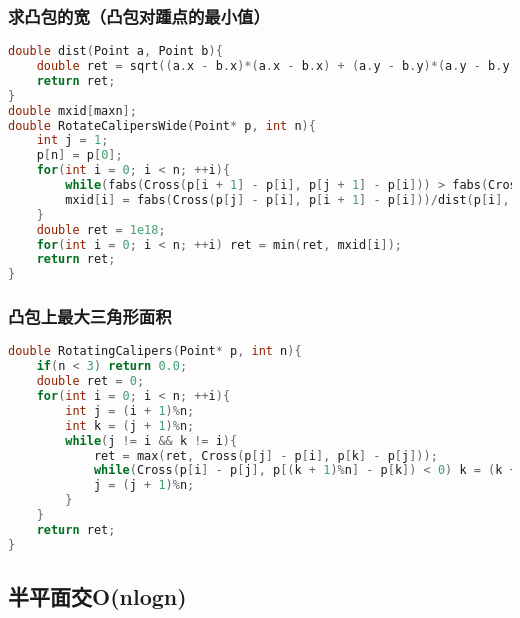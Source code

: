 \subsubsection{求凸包的宽（凸包对踵点的最小值）}

\begin{lstlisting}[language=C++]   
double dist(Point a, Point b){
    double ret = sqrt((a.x - b.x)*(a.x - b.x) + (a.y - b.y)*(a.y - b.y));
    return ret;
}
double mxid[maxn];
double RotateCalipersWide(Point* p, int n){
    int j = 1;
    p[n] = p[0];
    for(int i = 0; i < n; ++i){
        while(fabs(Cross(p[i + 1] - p[i], p[j + 1] - p[i])) > fabs(Cross(p[i + 1] - p[i], p[j] - p[i]))) j = (j + 1)%n;
        mxid[i] = fabs(Cross(p[j] - p[i], p[i + 1] - p[i]))/dist(p[i], p[i + 1]);
    }
    double ret = 1e18;
    for(int i = 0; i < n; ++i) ret = min(ret, mxid[i]);
    return ret;
}
\end{lstlisting}

\subsubsection{凸包上最大三角形面积}

\begin{lstlisting}[language=C++]
double RotatingCalipers(Point* p, int n){
    if(n < 3) return 0.0;
    double ret = 0;
    for(int i = 0; i < n; ++i){
        int j = (i + 1)%n;
        int k = (j + 1)%n;
        while(j != i && k != i){
            ret = max(ret, Cross(p[j] - p[i], p[k] - p[j]));
            while(Cross(p[i] - p[j], p[(k + 1)%n] - p[k]) < 0) k = (k + 1)%n;
            j = (j + 1)%n;
        }
    }
    return ret;
}
\end{lstlisting}

\subsection{半平面交O(nlogn)}

